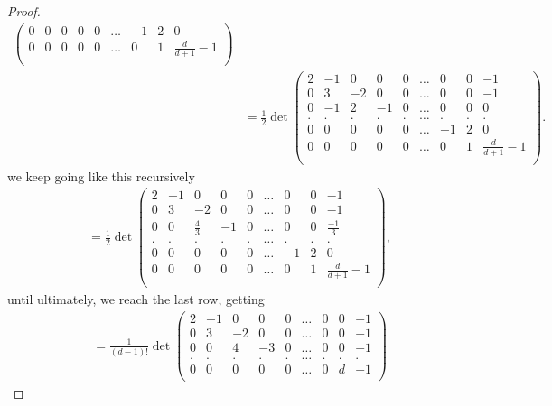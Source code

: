 \begin{proof}
\begin{align*}
\begin{pmatrix}
            0 & 0  &  0 & 0 & 0 & \dots & -1 & 2 & 0\\
            0 & 0  &  0 & 0 & 0 &\dots & 0 & 1 & \frac{d}{d+1}-1\\
        \end{pmatrix}\\
        &=\frac{1}{2}\det\begin{pmatrix}
            2 & -1 &  0  & 0 & 0 &\dots & 0 & 0 & -1\\
            0 & 3  &  -2 & 0 & 0 &\dots & 0 & 0 & -1\\
            0 & -1  &  2 & -1 & 0 & \dots & 0 & 0 & 0\\
            . & .  &  . & . & . & \dots & . & . & .\\
            0 & 0  &  0 & 0 & 0 & \dots & -1 & 2 & 0\\
            0 & 0  &  0 & 0 & 0 &\dots & 0 & 1 & \frac{d}{d+1}-1\\
        \end{pmatrix}.
    \end{align*}
    we keep going like this recursively
    \begin{align*}
            &=\frac{1}{2}\det\begin{pmatrix}
            2 & -1 &  0  & 0 & 0 &\dots & 0 & 0 & -1\\
            0 & 3  &  -2 & 0 & 0 &\dots & 0 & 0 & -1\\
            0 & 0  &  \frac{4}{3} & -1 & 0 & \dots & 0 & 0 & \frac{-1}{3}\\
            . & .  &  . & . & . & \dots & . & . & .\\
            0 & 0  &  0 & 0 & 0 & \dots & -1 & 2 & 0\\
            0 & 0  &  0 & 0 & 0 &\dots & 0 & 1 & \frac{d}{d+1}-1\\
        \end{pmatrix},
    \end{align*}
    until ultimately, we reach the last row, getting
    \begin{align*}
        &=\frac{1}{\left(d-1\right)!}\det\begin{pmatrix}
            2 & -1 &  0  & 0 & 0 &\dots & 0 & 0 & -1\\
            0 & 3  &  -2 & 0 & 0 &\dots & 0 & 0 & -1\\
            0 & 0  &  4 & -3 & 0 & \dots & 0 & 0 & -1\\
            . & .  &  . & . & . & \dots & . & . & .\\
            0 & 0  &  0 & 0 & 0 & \dots & 0 & d & -1\\

\end{pmatrix}
\end{align*}
\end{proof}
